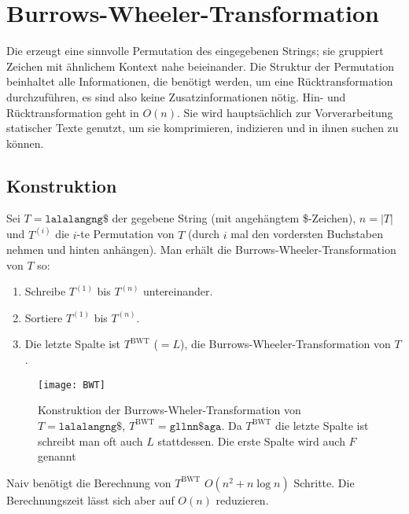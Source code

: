 \chapter{Burrows-Wheeler-Transformation}

Die  erzeugt eine sinnvolle Permutation des eingegebenen Strings; sie gruppiert Zeichen mit ähnlichem Kontext nahe beieinander. Die Struktur der Permutation beinhaltet alle Informationen, die benötigt werden, um eine Rücktransformation durchzuführen, es sind also keine Zusatzinformationen nötig. Hin- und Rücktransformation geht in \( O(n) \). Sie wird hauptsächlich zur Vorverarbeitung statischer Texte genutzt, um sie komprimieren, indizieren und in ihnen suchen zu können.

\section{Konstruktion}

Sei \( T = \texttt{lalalangng\$} \) der gegebene String (mit angehängtem \$-Zeichen), \( n = \left\vert T \right\vert \) und \( T^{(i)} \) die \( i \)-te Permutation von \( T \) (durch \( i \) mal den vordersten Buchstaben nehmen und hinten anhängen). Man erhält die Burrows-Wheeler-Transformation von \( T \) so:

\begin{enumerate}
  \item Schreibe \( T^{(1)} \) bis \( T^{(n)} \) untereinander.
  \item Sortiere \( T^{(1)} \) bis \( T^{(n)} \).
  \item Die letzte Spalte ist \( T^{\text{BWT}} \) (\( = L \)), die Burrows-Wheeler-Transformation von \( T \).
\end{enumerate}

\begin{figure}[H]
  \texttt{[image: BWT]}
  \captionsetup{width=.7\textwidth}
  \caption{Konstruktion der Burrows-Wheler-Transformation von \( T = \texttt{lalalangng\$}  \), \( T^{\text{BWT}} = \texttt{gllnn\$ aga} \). Da \( T^{\text{BWT}} \) die letzte Spalte ist schreibt man oft auch \( L \) stattdessen. Die erste Spalte wird auch \( F \) genannt}
\end{figure}

Naiv benötigt die Berechnung von \( T^{\text{BWT}} \) \( O(n^2 + n\log n) \) Schritte. Die Berechnungszeit lässt sich aber auf \( O(n) \) reduzieren.

